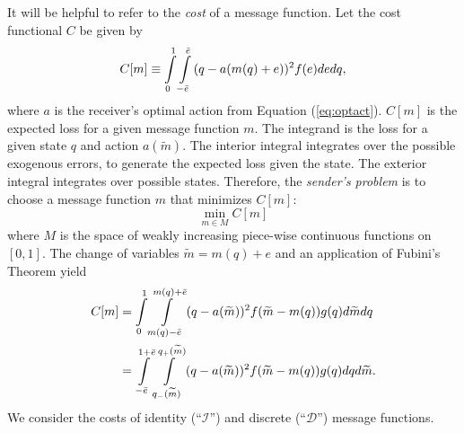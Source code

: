 \documentclass[12pt]{article}
\begin{document}
It will be helpful to refer to the \textit{cost }of a message function. Let the cost functional $C$ be given by 
\begin{equation}
	C[m]\equiv \int\displaylimits_{0}^{1}{\int\displaylimits_{-\bar{e}}^{\bar{e}}{(q-a(m(q)+e))^{2}f(e)de}dq},  
\end{equation}
where $a$ is the receiver's optimal action from Equation (\ref{eq:optact}). $C[m]$ is the expected loss for a given message function $m$. The integrand is the loss for a given state $q$ and action $a(\widetilde{m})$. The interior integral integrates over the possible exogenous errors, to generate the expected loss given the state. The exterior integral integrates over possible states. Therefore, the \textit{sender's problem} is to choose a message function $m$ that minimizes $C[m]$: 
\begin{equation}
	\min_{m\in M}C[m]
\end{equation}
where $M$ is the space of weakly increasing piece-wise continuous functions on $[0,1]$. The change of variables $\widetilde{m}=m(q)+e$ and an application of Fubini's Theorem yield 
\begin{align}
	C[m]& =\int\displaylimits_{0}^{1}{\int\displaylimits_{m(q)-\bar{e}}^{m(q)+\bar{e}}{(q-a( \widetilde{m}))^{2}f(\widetilde{m}-m(q))g(q)d\widetilde{m}}dq} \\
	& =\int\displaylimits_{-\bar{e}}^{1+\bar{e}}{\int\displaylimits_{q_{-}(\widetilde{m})}^{q_{+}(\widetilde{m})}{(q-a(\widetilde{m}))^{2}f(\widetilde{m}-m(q))g(q)dq}d\widetilde{m}}.
\end{align}
We consider the costs of identity (``$\mathcal{I}$'') and discrete (``$\mathcal{D}$'') message functions.

\end{document}
